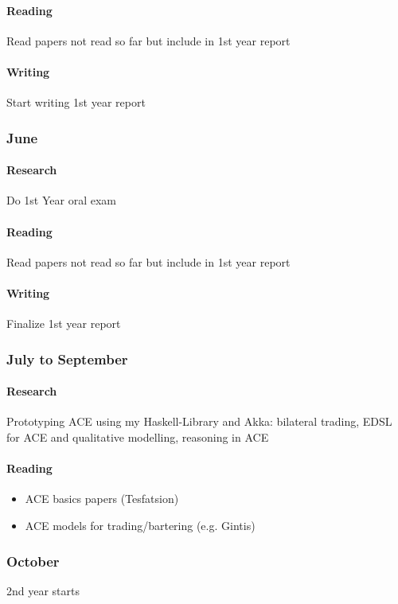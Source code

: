 \paragraph{Reading} Read papers not read so far but include in 1st year report
	
\paragraph{Writing} Start writing 1st year report

\subsubsection{June}
\paragraph{Research} Do 1st Year oral exam

\paragraph{Reading} Read papers  not read so far but include in 1st year report

\paragraph{Writing} Finalize 1st year report

\subsubsection{July to September}
\paragraph{Research} Prototyping ACE using my Haskell-Library and Akka: bilateral trading, EDSL for ACE and qualitative modelling, reasoning in ACE
	
\paragraph{Reading}
	\begin{itemize}	
		\item ACE basics papers (Tesfatsion)
		\item ACE models for trading/bartering (e.g. Gintis)
	\end{itemize}
	 
\subsubsection{October}
2nd year starts